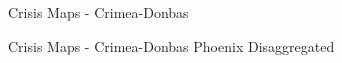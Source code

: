 \documentclass{article}
\begin{document}
\hphantom{em}
\begin{figure}
\caption{Crisis Maps - Crimea-Donbas \label{fig:p_471_combined}}
\end{figure}

\hphantom{em}
\begin{figure}
\caption{Crisis Maps - Crimea-Donbas Phoenix Disaggregated \label{fig:p_phoenix_plot_lv0_471}}
\end{figure}
\end{document}
